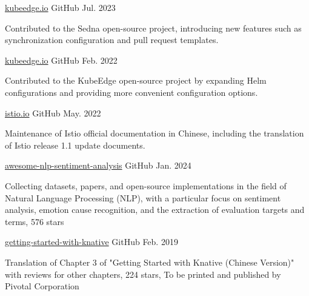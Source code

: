 \begin{cventries}
    \cventry
    {} %
    {\href{https://github.com/kubeedge/sedna}{kubeedge.io}} %
    {GitHub} %
    {Jul. 2023} %
    {
      \begin{cvitems} %
        \item Contributed to the Sedna open-source project, introducing new features such as synchronization configuration and pull request templates.
      \end{cvitems}
    }

    \cventry
    {} %
    {\href{https://github.com/kubeedge/kubeedge}{kubeedge.io}} %
    {GitHub} %
    {Feb. 2022} %
    {
      \begin{cvitems} %
        \item Contributed to the KubeEdge open-source project by expanding Helm configurations and providing more convenient configuration options.
      \end{cvitems}
    }

  \cventry
    {} %
    {\href{https://github.com/istio/istio.io}{istio.io}} %
    {GitHub} %
    {May. 2022} %
    {
      \begin{cvitems} %
        \item Maintenance of Istio official documentation in Chinese, including the translation of Istio release 1.1 update documents.
      \end{cvitems}
    }

  \cventry
    {} %
    {\href{https://github.com/haiker2011/awesome-nlp-sentiment-analysis}{awesome-nlp-sentiment-analysis}} %
    {GitHub} %
    {Jan. 2024} %
    {
      \begin{cvitems} %
        \item Collecting datasets, papers, and open-source implementations in the field of Natural Language Processing (NLP), with a particular focus on sentiment analysis, emotion cause recognition, and the extraction of evaluation targets and terms, 576 stars
      \end{cvitems}
    }

  \cventry
    {} %
    {\href{https://github.com/servicemesher/getting-started-with-knative}{getting-started-with-knative}} %
    {GitHub} %
    {Feb. 2019} %
    {
      \begin{cvitems} %
        \item Translation of Chapter 3 of "Getting Started with Knative (Chinese Version)" with reviews for other chapters, 224 stars, To be printed and published by Pivotal Corporation
      \end{cvitems}
    }

\end{cventries}